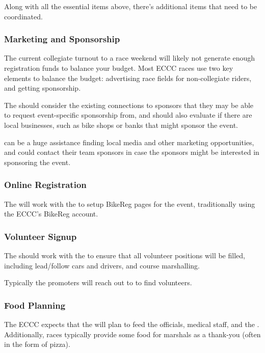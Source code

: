Along with all the essential items above, there's additional items that need to be coordinated.

\subsubsection{Marketing and Sponsorship}

The current collegiate turnout to a race weekend will likely not generate enough registration funds to balance your budget.
Most ECCC races use two key elements to balance the budget: advertising race fields for non-collegiate riders, and getting sponsorship.

The  should consider the existing connections to sponsors that they may be able to request event-specific sponsorship from,
and should also evaluate if there are local businesses, such as bike shops or banks that might sponsor the event.

 can be a huge assistance finding local media and other marketing opportunities, and could contact their team sponsors
in case the sponsors might be interested in sponsoring the event.

\subsubsection{Online Registration}

The  will work with the  to setup BikeReg pages for the event,
traditionally using the ECCC's BikeReg account.

\subsubsection{Volunteer Signup}

The  should work with the  to ensure that all volunteer positions will be filled,
including lead/follow cars and drivers, and course marshalling.

Typically the promoters will reach out to  to find volunteers.

\subsubsection{Food Planning}

The ECCC expects that the  will plan to feed the officials, medical staff, and the .
Additionally, races typically provide some food for marshals as a thank-you (often in the form of pizza).
